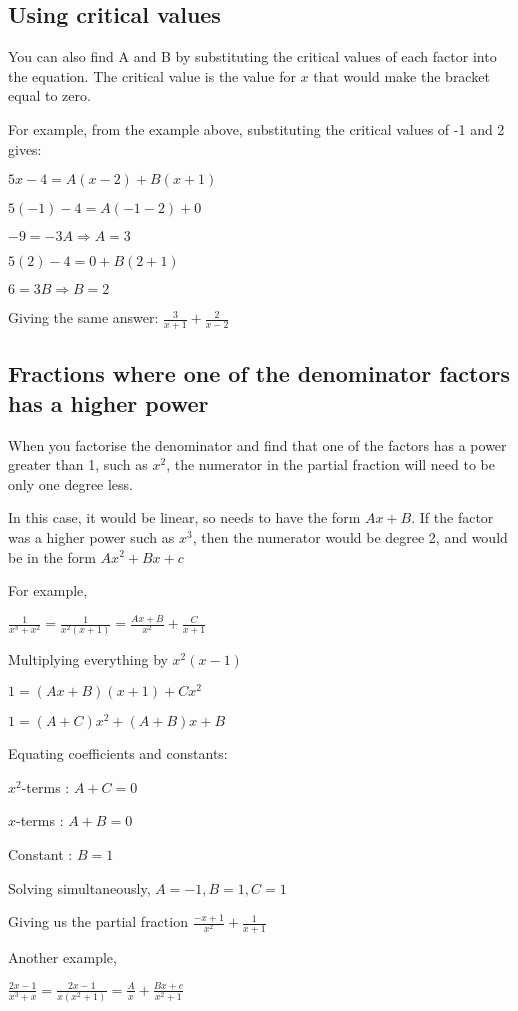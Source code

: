 \documentclass[../main.tex]{subfiles}
\begin{document}
\subsection*{Using critical values}
You can also find A and B by substituting the critical values of each factor into the equation. The critical value is the value for $x$ that would make the bracket equal to zero.

For example, from the example above, substituting the critical values of -1 and 2 gives:

$5x-4=A(x-2)+B(x+1)$

$5(-1)-4=A(-1-2)+0$

$-9=-3A \Rightarrow A=3$

$5(2)-4=0+B(2+1)$

$6=3B \Rightarrow B=2$

Giving the same answer: $\frac{3}{x+1}+\frac{2}{x-2}$

\subsection*{Fractions where one of the denominator factors has a higher power}

When you factorise the denominator and find that one of the factors has a power greater than 1, such as $x^2$, the numerator in the partial fraction will need to be only one degree less. 

In this case, it would be linear, so needs to have the form $Ax + B$.
If the factor was a higher power such as $x^3$, then the numerator would be degree 2, and would be in the form $Ax^2+Bx+c$

For example,

$\frac{1}{x^3+x^2}=\frac{1}{x^2(x+1)}=\frac{Ax+B}{x^2}+\frac{C}{x+1}$

Multiplying everything by $x^2(x-1)$

$1=(Ax+B)(x+1)+Cx^2$

$1=(A+C)x^2+(A+B)x+B$

Equating coefficients and constants:

$x^2$-terms : $A+C=0$

$x$-terms : $A+B=0$

Constant : $B=1$

Solving simultaneously, $A=-1, B=1, C=1$

Giving us the partial fraction $\frac{-x+1}{x^2}+\frac{1}{x+1}$

Another example,

$\frac{2x-1}{x^3+x}=\frac{2x-1}{x(x^2+1)}=\frac{A}{x}+\frac{Bx+c}{x^2+1}$
\end{document}
